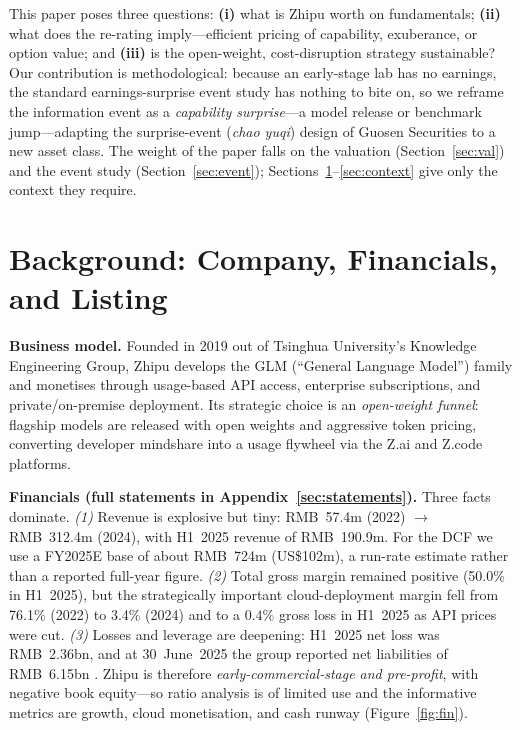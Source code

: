 \documentclass[11pt]{article}
\begin{document}
This paper poses three questions: \textbf{(i)} what is Zhipu worth on fundamentals; \textbf{(ii)} what does
the re-rating imply---efficient pricing of capability, exuberance, or option value; and \textbf{(iii)} is the
open-weight, cost-disruption strategy sustainable? Our contribution is methodological: because an early-stage
lab has no earnings, the standard earnings-surprise event study \citep{ball1968,bernard1989} has nothing to
bite on, so we reframe the information event as a \emph{capability surprise}---a model release or benchmark
jump---adapting the surprise-event (\emph{chao yuqi}) design of Guosen Securities\citep{guosen2020} to a new
asset class. The
weight of the paper falls on the valuation (Section~\ref{sec:val}) and the event study
(Section~\ref{sec:event}); Sections~\ref{sec:bg}--\ref{sec:context} give only the context they require.

\section{Background: Company, Financials, and Listing}
\label{sec:bg}
\textbf{Business model.} Founded in 2019 out of Tsinghua University's Knowledge Engineering Group, Zhipu
develops the GLM (``General Language Model'') family and monetises through usage-based API access, enterprise
subscriptions, and private/on-premise deployment. Its strategic choice is an \emph{open-weight funnel}:
flagship models are released with open weights and aggressive token pricing, converting developer mindshare
into a usage flywheel via the Z.ai and Z.code platforms.

\textbf{Financials (full statements in Appendix~\ref{sec:statements}).} Three facts dominate. \emph{(1)}
Revenue is explosive but tiny: RMB~57.4m (2022) $\to$ RMB~312.4m (2024), with H1~2025 revenue of
RMB~190.9m. For the DCF we use a FY2025E base of about RMB~724m (US\$102m), a run-rate estimate rather than a
reported full-year figure. \emph{(2)} Total gross margin remained positive (50.0\% in H1~2025), but the
strategically important cloud-deployment margin fell from 76.1\% (2022) to 3.4\% (2024) and to a $0.4\%$
gross loss in H1~2025 as API prices were cut. \emph{(3)} Losses and leverage are deepening: H1~2025 net loss
was RMB~2.36bn, and at 30~June~2025 the group reported net liabilities of RMB~6.15bn
\citep{prospectus2513}. Zhipu is therefore \emph{early-commercial-stage and pre-profit}, with negative book
equity---so ratio analysis is of
limited use and the informative metrics are growth, cloud monetisation, and cash runway
(Figure~\ref{fig:fin}).
\end{document}
